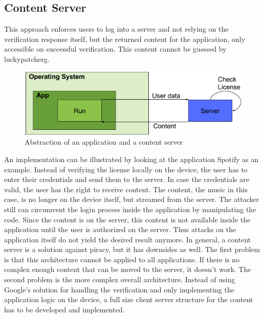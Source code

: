 \subsection{Content Server} \label{section:counter-replace-server}
This approach enforces users to log into a server and not relying on the verification response itself, but the returned content for the application, only accessible on successful verification.
This content cannot be guessed by \gls{luckypatcherg}.
\newline
\begin{figure}[h]
    \centering
    \includegraphics[width=1\textwidth]{data/contentServer.png}
    \caption{Abstraction of an application and a content server}
    \label{fig:contentServer}
\end{figure}
\newline
An implementation can be illustrated by looking at the application Spotify \cite{spotify} as an example.
Instead of verifying the license locally on the device, the user has to enter their credentials and send them to the server.
In case the credentials are valid, the user has the right to receive content.
The content, the music in this case, is no longer on the device itself, but streamed from the server.
The attacker still can circumvent the login process inside the application by manipulating the code.
Since the content is on the server, this content is not available inside the application until the user is authorized on the server.
Thus attacks on the application itself do not yield the desired result anymore.
\newline
\newline
In general, a content server is a solution against piracy, but it has downsides as well.
The first problem is that this architecture cannot be applied to all applications.
If there is no complex enough content that can be moved to the server, it doesn't work.
\newline
The second problem is the more complex overall architecture.
Instead of using Google's solution for handling the verification and only implementing the application logic on the device, a full size client server structure for the content has to be developed and implemented.
